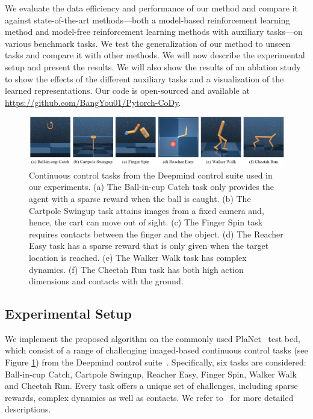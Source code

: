 \documentclass[a4paper,12pt]{article}
\begin{document}
We evaluate the data efficiency and performance of our method and compare it against state-of-the-art methods---both a model-based reinforcement learning method and model-free reinforcement learning methods with auxiliary tasks---on various benchmark tasks. We test the generalization of our method to unseen tasks and compare it with other methods. We will now describe the experimental setup and present the results. We will also show the results of an ablation study to show the effects of the different auxiliary tasks and a visualization of the learned representations. Our code is open-sourced and available at \mbox{\url{https://github.com/BangYou01/Pytorch-CoDy}}. 

\begin{figure}
\centering
\includegraphics[width=\textwidth]{dmc.jpg}
\caption{Continuous control tasks from the Deepmind control suite used in our experiments. (a) The Ball-in-cup Catch task only provides the agent with a sparse reward when the ball is caught. (b) The Cartpole Swingup task attains images from a fixed camera and, hence, the cart can move out of sight. (c) The Finger Spin task requires contacts between the finger and the object. (d) The Reacher Easy task has a sparse reward that is only given when the target location is reached. (e) The Walker Walk task has complex dynamics. (f) The Cheetah Run task has both high action dimensions and contacts with the ground.}
\label{fig:dmc_task}
\end{figure}
\subsection{Experimental Setup}

We implement the proposed algorithm on the commonly used PlaNet~\cite{hafner2019learning} test bed, which consist of a range of challenging imaged-based continuous control tasks (see Figure \ref{fig:dmc_task}) from the Deepmind control suite~\cite{tassa2018deepmind}. Specifically, six tasks are considered: Ball-in-cup Catch, Cartpole Swingup, Reacher Easy, Finger Spin, Walker Walk and Cheetah Run. Every task offers a unique set of challenges, including sparse rewards, complex dynamics as well as contacts. We refer to~\citet{tassa2018deepmind} for more detailed descriptions.
\end{document}
